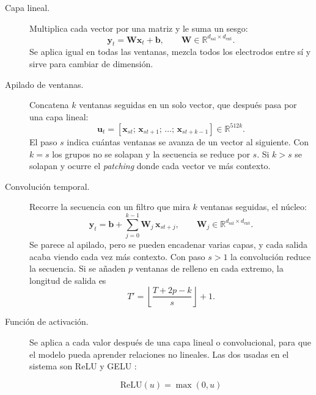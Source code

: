 \begin{description}
  \item[Capa lineal.] Multiplica cada vector por una matriz y le suma un sesgo:
  \begin{equation}
    \mathbf{y}_t = \mathbf{W}\mathbf{x}_t + \mathbf{b}, \qquad \mathbf{W} \in \mathbb{R}^{d_{\mathrm{sal}} \times d_{\mathrm{ent}}}.
    \label{eq:lineal}
  \end{equation}
  Se aplica igual en todas las ventanas, mezcla todos los electrodos entre sí y sirve para cambiar de dimensión.

  \item[Apilado de ventanas.] Concatena $k$ ventanas seguidas en un solo vector, que después pasa por una capa lineal:
  \begin{equation}
    \mathbf{u}_{t} = [\mathbf{x}_{st};\, \mathbf{x}_{st+1};\, \dots;\, \mathbf{x}_{st+k-1}] \in \mathbb{R}^{512k}.
    \label{eq:apilado}
  \end{equation}
  El paso $s$ indica cuántas ventanas se avanza de un vector al siguiente. Con $k = s$ los grupos no se solapan y la secuencia se reduce por $s$. Si $k > s$ se solapan y ocurre el \textit{patching} donde cada vector ve más contexto.

  \item[Convolución temporal.] Recorre la secuencia con un filtro que mira $k$ ventanas seguidas, el núcleo:
  \begin{equation}
    \mathbf{y}_t = \mathbf{b} + \sum_{j=0}^{k-1} \mathbf{W}_j\, \mathbf{x}_{st+j}, \qquad \mathbf{W}_j \in \mathbb{R}^{d_{\mathrm{sal}} \times d_{\mathrm{ent}}}.
    \label{eq:conv1d}
  \end{equation}
  Se parece al apilado, pero se pueden encadenar varias capas, y cada salida acaba viendo cada vez más contexto. Con paso $s > 1$ la convolución reduce la secuencia. Si se añaden $p$ ventanas de relleno en cada extremo, la longitud de salida es
  \begin{equation}
    T' = \left\lfloor \frac{T + 2p - k}{s} \right\rfloor + 1.
    \label{eq:conv-longitud}
  \end{equation}

  \item[Función de activación.] Se aplica a cada valor después de una capa lineal o convolucional, para que el modelo pueda aprender relaciones no lineales. Las dos usadas en el sistema son ReLU y GELU \cite{hendrycks2016gelu}:

  \begin{equation}
    \mathrm{ReLU}(u) = \max(0, u)
  \end{equation}


\end{description}
